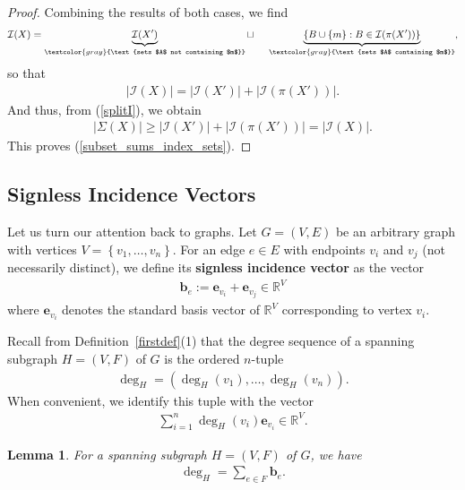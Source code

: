 \documentclass[12pt]{article}
\newtheorem{lemma}[theorem]{Lemma}
\theoremstyle{definition}
\theoremstyle{remark}
\newcommand{\set}[1]{\left\{ #1 \right\}}
\newcommand{\abs}[1]{\left| #1 \right|}
\newcommand{\tup}[1]{\left( #1 \right)}
\begin{document}
\begin{proof}
Combining the results of both cases, we find
\begin{align*}
    \mathcal{I}(X) = \underbrace{\mathcal{I}(X')}_{\textcolor{gray}{\text{sets $A$ not containing $m$}}} \sqcup\ \ \ \ \underbrace{\set{B \cup \{m\} : B \in \mathcal{I}(\pi(X'))}}_{\textcolor{gray}{\text{sets $A$ containing $m$}}},
\end{align*} so that
\begin{align*}
    \abs{\mathcal{I}(X)} = \abs{\mathcal{I}(X')} + \abs{\mathcal{I}(\pi(X'))}.
\end{align*} And thus, from (\ref{splitI}), we obtain \begin{align*}
    \abs{\Sigma(X)} \geq \abs{\mathcal{I}(X')} + \abs{\mathcal{I}(\pi(X'))} = \abs{\mathcal{I}(X)}.
\end{align*} This proves (\ref{subset_sums_index_sets}).
\end{proof}

\subsection{Signless Incidence Vectors}
Let us turn our attention back to graphs. Let $G = (V,E)$ be an arbitrary graph with vertices $V=\set{v_1,\ldots,v_n}$. For an edge $e \in E$ with endpoints $v_i$ and $v_j$ (not necessarily distinct), we define its \textbf{signless incidence vector} as the vector \begin{align*}
    \mathbf{b}_e := \mathbf{e}_{v_i}+\mathbf{e}_{v_j}
    \in \mathbb{R}^V
\end{align*} where $\mathbf{e}_{v_i}$ denotes the standard basis vector of $\mathbb{R}^V$ corresponding to vertex $v_i$.

Recall from Definition~\ref{firstdef}(1) that the degree sequence of a spanning subgraph $H=(V,F)$ of $G$ is the ordered $n$-tuple \begin{align*}
    \deg_H = \tup{\deg_H(v_1),\ldots,\deg_H(v_n)}.
\end{align*} When convenient, we identify this tuple with the vector \begin{align*}
    \sum_{i=1}^n\deg_H(v_i)\mathbf{e}_{v_i} \in \mathbb{R}^V.
\end{align*}

\begin{lemma}\label{forest_incidence}
    For a spanning subgraph $H=(V,F)$ of $G$, we have \begin{align}\label{degsec_vec}
    \deg_H = \sum_{e \in F}\mathbf{b}_e.
\end{align}
\end{lemma}
\end{document}
